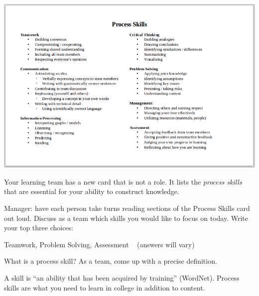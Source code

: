 
\vspace{-1ex}
\begin{multicols}{2}

\begin{center}
\includegraphics[width=0.8\linewidth]{Meta/process1.png}
\end{center}

\columnbreak
\vspace*{2em}

Your learning team has a new card that is not a role.
It lists the \emph{process skills} that are essential for your ability to construct knowledge.


\end{multicols}




\Q Manager: have each person take turns reading sections of the Process Skills card out loud.
Discuss as a team which skills you would like to focus on today.
Write your top three choices:

\begin{answer}
Teamwork, Problem Solving, Assessment ~ (answers will vary)
\end{answer}


\Q What is a process skill?
As a team, come up with a precise definition.

\begin{answer}
A skill is ``an ability that has been acquired by training'' (WordNet).
Process skills are what you need to learn in college in addition to content.
\end{answer}


